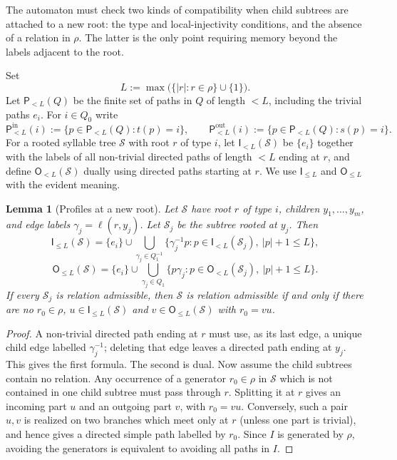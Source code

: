 \documentclass[11pt,a4paper]{amsart}
\theoremstyle{definition}
\theoremstyle{plain}
\newtheorem{lemma}[definition]{Lemma}
\theoremstyle{remark}
\numberwithin{equation}{section}
\begin{document}
The automaton must check two kinds of compatibility when child subtrees are attached to a new root: the type and local-injectivity conditions, and the absence of a relation in $\rho$. The latter is the only point requiring memory beyond the labels adjacent to the root.

Set
\[
L:=\max\bigl(\{|r|:r\in\rho\}\cup\{1\}\bigr).
\]
Let $\mathsf P_{<L}(Q)$ be the finite set of paths in $Q$ of length $<L$, including the trivial paths $e_i$. For $i\in Q_0$ write
\[
\mathsf P^{\mathrm{in}}_{<L}(i):=\{p\in\mathsf P_{<L}(Q):t(p)=i\},\qquad \mathsf P^{\mathrm{out}}_{<L}(i):=\{p\in\mathsf P_{<L}(Q):s(p)=i\}.
\]
For a rooted syllable tree $\mathcal S$ with root $r$ of type $i$, let $\mathsf I_{<L}(\mathcal S)$ be $\{e_i\}$ together with the labels of all non-trivial directed paths of length $<L$ ending at $r$, and define $\mathsf O_{<L}(\mathcal S)$ dually using directed paths starting at $r$. We use $\mathsf I_{\leq L}$ and $\mathsf O_{\leq L}$ with the evident meaning.

\begin{lemma}[Profiles at a new root]\label{lem:profiles}
Let $\mathcal S$ have root $r$ of type $i$, children $y_1,\ldots,y_m$, and edge labels $\gamma_j=\ell(r,y_j)$. Let $\mathcal S_j$ be the subtree rooted at $y_j$. Then
\[
\mathsf I_{\leq L}(\mathcal S)=\{e_i\}\cup\bigcup_{\gamma_j\in Q_1^{-1}}\{\gamma_j^{-1}p:p\in\mathsf I_{<L}(\mathcal S_j),\ |p|+1\leq L\},
\]
\[
\mathsf O_{\leq L}(\mathcal S)=\{e_i\}\cup\bigcup_{\gamma_j\in Q_1}\{p\gamma_j:p\in\mathsf O_{<L}(\mathcal S_j),\ |p|+1\leq L\}.
\]
If every $\mathcal S_j$ is relation admissible, then $\mathcal S$ is relation admissible if and only if there are no $r_0\in\rho$, $u\in\mathsf I_{\leq L}(\mathcal S)$ and $v\in\mathsf O_{\leq L}(\mathcal S)$ with $r_0=vu$.
\end{lemma}

\begin{proof}
A non-trivial directed path ending at $r$ must use, as its last edge, a unique child edge labelled $\gamma_j^{-1}$; deleting that edge leaves a directed path ending at $y_j$. This gives the first formula. The second is dual. Now assume the child subtrees contain no relation. Any occurrence of a generator $r_0\in\rho$ in $\mathcal S$ which is not contained in one child subtree must pass through $r$. Splitting it at $r$ gives an incoming part $u$ and an outgoing part $v$, with $r_0=vu$. Conversely, such a pair $u,v$ is realized on two branches which meet only at $r$ (unless one part is trivial), and hence gives a directed simple path labelled by $r_0$. Since $I$ is generated by $\rho$, avoiding the generators is equivalent to avoiding all paths in $I$.
\end{proof}
\end{document}
